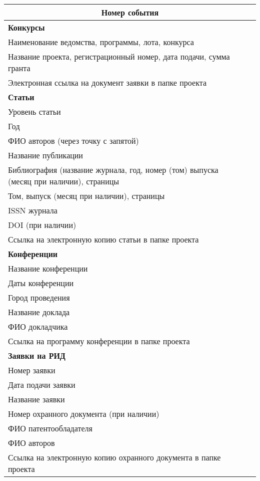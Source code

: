 \documentclass{article}
\begin{document}
\renewcommand{\arraystretch}{1.3}
\setlength{\tabcolsep}{10pt}

\begin{longtable}{|p{5cm}|p{5cm}|}
    \hline
    \multicolumn{2}{|c|}{\textbf{Номер события}} \\ %
    \hline
    \textbf{Конкурсы} &  \\
    \hline
    Наименование ведомства, программы, лота, конкурса & \\
    Название проекта, регистрационный номер, дата подачи, сумма гранта & \\
    Электронная ссылка на документ заявки в папке проекта & \\
    \hline
    \textbf{Статьи} &  \\
    \hline
    Уровень статьи &  \\
    Год &  \\
    ФИО авторов (через точку с запятой) & \\
    Название публикации & \\
    Библиография (название журнала, год, номер (том) выпуска (месяц при наличии), страницы & \\
    Том, выпуск (месяц при наличии), страницы & \\
    ISSN журнала & \\
    DOI (при наличии) & \\
    Ссылка на электронную копию статьи в папке проекта & \\
    \hline
    \textbf{Конференции} &  \\
    \hline
    Название конференции & \\
    Даты конференции & \\
    Город проведения & \\
    Название доклада & \\
    ФИО докладчика & \\
    Ссылка на программу конференции в папке проекта & \\
    \hline
    \textbf{Заявки на РИД} &  \\
    \hline
    Номер заявки & \\
    Дата подачи заявки & \\
    Название заявки & \\
    Номер охранного документа (при наличии) & \\
    ФИО патентообладателя & \\
    ФИО авторов & \\
    Ссылка на электронную копию охранного документа в папке проекта & \\

\end{longtable}
\end{document}
